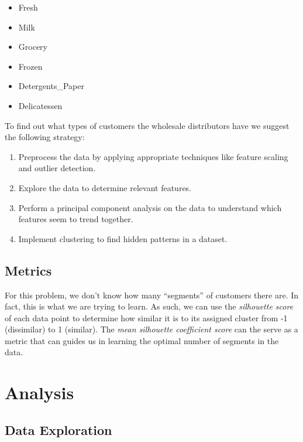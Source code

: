 \documentclass[twoside,openright,titlepage,numbers=noenddot,headinclude,%
               footinclude=true,cleardoublepage=empty,abstractoff,BCOR=5mm,%
               paper=a4,fontsize=11pt,ngerman,american]{scrreprt}
\numberwithin{theorem}{chapter}
\numberwithin{definition}{chapter}
\numberwithin{algorithm}{chapter}
\numberwithin{figure}{chapter}
\numberwithin{table}{chapter}
\numberwithin{equation}{chapter}
\begin{document}
\begin{itemize}%
\item Fresh
\item Milk
\item Grocery
\item Frozen
\item Detergents\_Paper
\item Delicatessen
\end{itemize}



To find out what types of customers the wholesale distributors have we suggest the following strategy:
\begin{enumerate}%
\item Preprocess the data by applying appropriate techniques like feature scaling and outlier detection.
\item Explore the data to determine relevant features.
\item Perform a principal component analysis on the data to understand which features seem to trend together.
\item Implement clustering to find hidden patterns in a dataset.

\end{enumerate}



\section*{Metrics}
For this problem, we don't know how many ``segments'' of customers there are. In fact, this is what we are trying to learn. As such, we can use the \emph{silhouette score} of each data point to determine how similar it is to its assigned cluster from -1 (dissimilar) to 1 (similar). The \emph{mean silhouette coefficient score} can the serve as a metric that can guides us in learning the optimal number of segments in the data.




\chapter*{Analysis}

\section*{Data Exploration}
\end{document}
